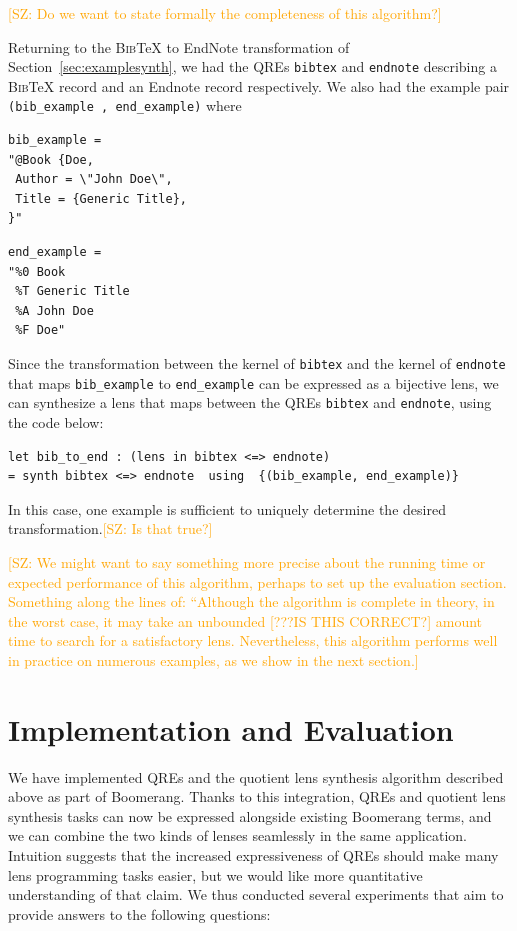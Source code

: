 \documentclass[acmsmall,review,anonymous]{acmart}
\newcommand{\FINISH}[3]{\ifdraft\textcolor{#1}{[#2: #3]}\fi}
\newcommand{\saz}[1]{\FINISH{orange}{SZ}{#1}}
\newcommand{\bibtex}{\textsc{Bib}\TeX{}}
\newcommand{\cd}[1]{\lstinline[backgroundcolor=\color{white}]$#1$}
\begin{document}
\saz{Do we want to state formally the completeness of this algorithm?}

Returning to the \bibtex{} to EndNote transformation of
Section~\ref{sec:examplesynth}, we had the QREs \cd{bibtex} and \cd{endnote}
describing a \bibtex{} record and an Endnote record respectively. We also had
the example pair \cd{(bib_example , end_example)} where

\begin{minipage}{3in}
\begin{lstlisting}
bib_example =
"@Book {Doe,
 Author = \"John Doe\",
 Title = {Generic Title},
}"
\end{lstlisting}
\end{minipage}
\begin{minipage}{3in}
\begin{lstlisting}
end_example =
"%0 Book
 %T Generic Title
 %A John Doe
 %F Doe"
\end{lstlisting}
\end{minipage}

Since the transformation between the kernel of \cd{bibtex} and the kernel of
\cd{endnote} that maps \cd{bib_example} to \cd{end_example} can be
expressed as a bijective lens, we can synthesize a lens that maps between the
QREs \cd{bibtex} and \cd{endnote}, using the code below:

\begin{lstlisting}
let bib_to_end : (lens in bibtex <=> endnote)
= synth bibtex <=> endnote  using  {(bib_example, end_example)}
\end{lstlisting}

In this case, one example is sufficient to uniquely determine the desired
transformation.\saz{Is that true?}

\saz{We might want to say something more precise about the running time or
  expected performance of this algorithm, perhaps to set up the evaluation
  section.  Something along the lines of: ``Although the algorithm is complete
  in theory, in the worst case, it may take an unbounded [???IS THIS CORRECT?]
  amount time to search for a satisfactory lens.  Nevertheless, this algorithm
  performs well in practice on numerous examples, as we show in the next
  section.} 


\section{Implementation and Evaluation}
\label{impl}


We have implemented QREs and the quotient lens synthesis algorithm described
above as part of Boomerang. Thanks to this integration, QREs and quotient lens
synthesis tasks can now be expressed alongside existing Boomerang terms, and we
can combine the two kinds of lenses seamlessly in the same application.
Intuition suggests that the increased expressiveness of QREs should make many
lens programming tasks easier, but we would like more quantitative understanding
of that claim.  We thus conducted several experiments that aim to provide
answers to the following questions:
\end{document}
